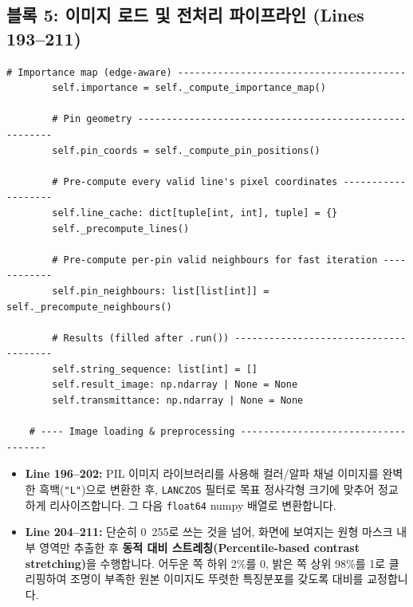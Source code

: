 \subsection*{블록 5: 이미지 로드 및 전처리 파이프라인 (Lines 193--211)}
\begin{lstlisting}[firstnumber=193]
        # Importance map (edge-aware) ----------------------------------------
        self.importance = self._compute_importance_map()

        # Pin geometry -------------------------------------------------------
        self.pin_coords = self._compute_pin_positions()

        # Pre-compute every valid line's pixel coordinates -------------------
        self.line_cache: dict[tuple[int, int], tuple] = {}
        self._precompute_lines()

        # Pre-compute per-pin valid neighbours for fast iteration ------------
        self.pin_neighbours: list[list[int]] = self._precompute_neighbours()

        # Results (filled after .run()) --------------------------------------
        self.string_sequence: list[int] = []
        self.result_image: np.ndarray | None = None
        self.transmittance: np.ndarray | None = None

    # ---- Image loading & preprocessing ------------------------------------
\end{lstlisting}
\begin{itemize}
\item \textbf{Line 196--202:} PIL 이미지 라이브러리를 사용해 컬러/알파 채널 이미지를 완벽한 흑백(\texttt{"L"})으로 변환한 후, \texttt{LANCZOS} 필터로 목표 정사각형 크기에 맞추어 정교하게 리사이즈합니다. 그 다음 \texttt{float64} numpy 배열로 변환합니다.
\item \textbf{Line 204--211:} 단순히 0\string~255로 쓰는 것을 넘어, 화면에 보여지는 원형 마스크 내부 영역만 추출한 후 \textbf{동적 대비 스트레칭(Percentile-based contrast stretching)}을 수행합니다. 어두운 쪽 하위 2\%를 0, 밝은 쪽 상위 98\%를 1로 클리핑하여 조명이 부족한 원본 이미지도 뚜렷한 특징분포를 갖도록 대비를 교정합니다.
\end{itemize}

